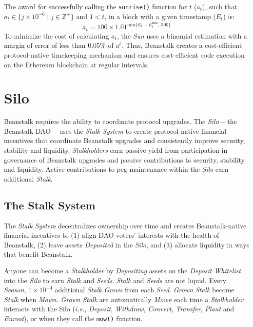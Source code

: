 \documentclass[tikz]{article}
\newcommand{\code}[1]{\texttt{#1}}
\newcommand{\term}[1]{\textsl{#1}}
\begin{document}
The award for successfully calling the \code{sunrise()} function for $t$ ($a_t$), such that $a_t \in \{j \times 10^{-6} \mid j \in \mathbb{Z}^{+} \}$ and $1 < t$, in a block with a given timestamp ($E_t$) is:
$$a_t = 100 \times 1.01^{\text{min}\{{E_t - E_{t}^{\text{min}}},\ 300\}}$$
To minimize the cost of calculating $a_t$, the \term{Sun} uses a binomial estimation with a margin of error of less than 0.05\% of $a^t$. Thus, Beanstalk creates a cost-efficient protocol-native timekeeping mechanism and ensures cost-efficient code execution on the Ethereum blockchain at regular intervals.

\section{Silo}
Beanstalk requires the ability to coordinate protocol upgrades. The \term{Silo} \textbf{--} the Beanstalk DAO \textbf{--} uses the \term{Stalk System} to create protocol-native financial incentives that coordinate Beanstalk upgrades and consistently improve security, stability and liquidity. \term{Stalkholders} earn passive yield from participation in governance of Beanstalk upgrades and passive contributions to security, stability and liquidity. Active contributions to peg maintenance within the \term{Silo} earn additional \term{Stalk}.

\subsection{The Stalk System}
The \term{Stalk System} decentralizes ownership over time and creates Beanstalk-native financial incentives to (1) align DAO voters' interests with the health of Beanstalk, (2) leave assets \term{Deposited} in the \term{Silo}, and (3) allocate liquidity in ways that benefit Beanstalk.

Anyone can become a \term{Stalkholder} by \term{Depositing} assets on the \term{Deposit} \term{Whitelist} into the \term{Silo} to earn \term{Stalk} and \term{Seeds}. \term{Stalk} and \term{Seeds} are not liquid. Every \term{Season}, $1 \times 10^{-4}$ additional \term{Stalk} \term{Grows} from each \term{Seed}. \term{Grown} \term{Stalk} become \term{Stalk} when \term{Mown}. \term{Grown} \term{Stalk} are automatically \term{Mown} each time a \term{Stalkholder} interacts with the Silo (\term{i.e.}, \term{Deposit}, \term{Withdraw}, \term{Convert}, \term{Transfer}, \term{Plant} and \term{Enroot}), or when they call the \code{mow()} function.
\end{document}
